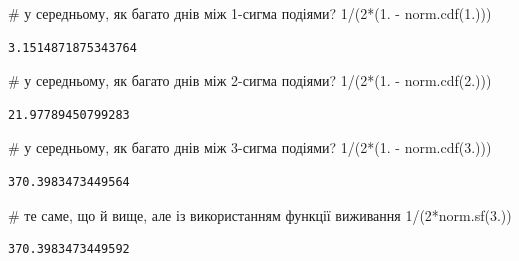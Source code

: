 \documentclass[
  letterpaper,
]{report}
\newenvironment{Shaded}{\begin{snugshade}}{\end{snugshade}}
\newcommand{\CommentTok}[1]{\textcolor[rgb]{0.37,0.37,0.37}{#1}}
\newcommand{\DecValTok}[1]{\textcolor[rgb]{0.68,0.00,0.00}{#1}}
\newcommand{\FloatTok}[1]{\textcolor[rgb]{0.68,0.00,0.00}{#1}}
\newcommand{\NormalTok}[1]{\textcolor[rgb]{0.00,0.23,0.31}{#1}}
\newcommand{\OperatorTok}[1]{\textcolor[rgb]{0.37,0.37,0.37}{#1}}
\begin{document}
\begin{Shaded}
\begin{Highlighting}[]
\CommentTok{\# у середньому, як багато днів між 1{-}сигма подіями?}
\DecValTok{1}\OperatorTok{/}\NormalTok{(}\DecValTok{2}\OperatorTok{*}\NormalTok{(}\FloatTok{1.} \OperatorTok{{-}}\NormalTok{ norm.cdf(}\FloatTok{1.}\NormalTok{)))}
\end{Highlighting}
\end{Shaded}

\begin{verbatim}
3.1514871875343764
\end{verbatim}

\begin{Shaded}
\begin{Highlighting}[]
\CommentTok{\# у середньому, як багато днів між 2{-}сигма подіями?}
\DecValTok{1}\OperatorTok{/}\NormalTok{(}\DecValTok{2}\OperatorTok{*}\NormalTok{(}\FloatTok{1.} \OperatorTok{{-}}\NormalTok{ norm.cdf(}\FloatTok{2.}\NormalTok{)))}
\end{Highlighting}
\end{Shaded}

\begin{verbatim}
21.97789450799283
\end{verbatim}

\begin{Shaded}
\begin{Highlighting}[]
\CommentTok{\# у середньому, як багато днів між 3{-}сигма подіями?}
\DecValTok{1}\OperatorTok{/}\NormalTok{(}\DecValTok{2}\OperatorTok{*}\NormalTok{(}\FloatTok{1.} \OperatorTok{{-}}\NormalTok{ norm.cdf(}\FloatTok{3.}\NormalTok{)))}
\end{Highlighting}
\end{Shaded}

\begin{verbatim}
370.3983473449564
\end{verbatim}

\begin{Shaded}
\begin{Highlighting}[]
\CommentTok{\# те саме, що й вище, але із використанням функції виживання}
\DecValTok{1}\OperatorTok{/}\NormalTok{(}\DecValTok{2}\OperatorTok{*}\NormalTok{norm.sf(}\FloatTok{3.}\NormalTok{))}
\end{Highlighting}
\end{Shaded}

\begin{verbatim}
370.3983473449592
\end{verbatim}
\end{document}

